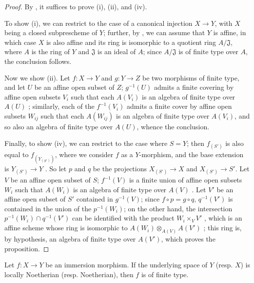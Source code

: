 \begin{proof}
By , it suffices to prove (i), (ii), and (iv).

To show (i), we can restrict to the case of a canonical injection $X\to Y$, with $X$ being a closed subprescheme of $Y$;
further, by , we can assume that $Y$ is affine, in which case $X$ is also affine  and its ring is isomorphic to a quotient ring $A/\mathfrak{J}$, where $A$ is the ring of $Y$ and $\mathfrak{J}$ is an ideal of $A$;
since $A/\mathfrak{J}$ is of finite type over $A$, the conclusion follows.

Now we show (ii).
Let $f:X\to Y$ and $g:Y\to Z$ be two morphisms of finite type, and let $U$ be an affine open subset of $Z$;
$g^{-1}(U)$ admits a finite covering by affine open subsets $V_i$ such that each $A(V_i)$ is an algebra of finite type over $A(U)$ ;
similarly,
each of the $f^{-1}(V_i)$ admits a finite cover by affine open subsets $W_{ij}$ such that each $A(W_{ij})$ is an algebra of finite type over $A(V_i)$, and so also an algebra of finite type over $A(U)$, whence the conclusion.

Finally, to show (iv), we can restrict to the case where $S=Y$;
then $f_{(S')}$ is also equal to $f_{(Y_{(S')})}$, where we consider $f$ as a $Y$-morphism, and the base extension is $Y_{(S')}\to Y$ .
So let $p$ and $q$ be the projections $X_{(S')}\to X$ and $X_{(S')}\to S'$.
Let $V$ be an affine open subset of $S$;
$f^{-1}(V)$ is a finite union of affine open subsets $W_i$ such that $A(W_i)$ is an algebra of finite type over $A(V)$ .
Let $V'$ be an affine open subset of $S'$ contained in $g^{-1}(V)$;
since $f\circ p=g\circ q$, $q^{-1}(V')$ is contained in the union of the $p^{-1}(W_i)$;
on the other hand, the intersection $p^{-1}(W_i)\cap q^{-1}(V')$ can be identified with the product $W_i\times_V V'$ , which is an affine scheme whose ring is isomorphic to $A(W_i)\otimes_{A(V)}A(V')$ ;
this ring is, by hypothesis, an algebra of finite type over $A(V')$, which proves the proposition.
\end{proof}

\begin{corollary}[6.3.5]
\label{I.6.3.5}
Let $f:X\to Y$ be an immersion morphism.
If the underlying space of $Y$ (resp. $X$) is locally Noetherian (resp. Noetherian), then $f$ is of finite type.
\end{corollary}

